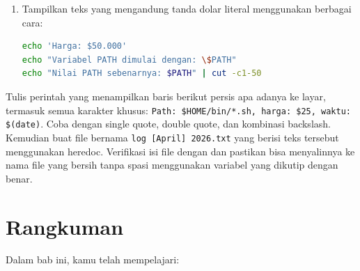 \begin{enumerate}
\begin{lstlisting}[language=bash, caption={Variabel untuk path dengan spasi}]
mkdir -p ~/lab-os/chapter06-bash/arsip
cp "$FILE_LAMA" "$FILE_BARU"
ls -lah ~/lab-os/chapter06-bash/arsip/
\end{lstlisting}
    \textit{Amati:} kutipan ganda pada \texttt{"\$FILE\_LAMA"} memastikan
    path yang mengandung spasi diperlakukan sebagai satu argumen, bukan
    dua argumen terpisah.

    \item Tampilkan teks yang mengandung tanda dolar literal menggunakan
          berbagai cara:
\begin{lstlisting}[language=bash, caption={Menampilkan karakter khusus secara literal}]
echo 'Harga: $50.000'
echo "Variabel PATH dimulai dengan: \$PATH"
echo "Nilai PATH sebenarnya: $PATH" | cut -c1-50
\end{lstlisting}
\end{enumerate}

\begin{challengebox}
Tulis perintah  yang menampilkan baris berikut persis apa
adanya ke layar, termasuk semua karakter khusus:
\texttt{Path: \$HOME/bin/*.sh, harga: \$25, waktu: \$(date)}.
Coba dengan single quote, double quote, dan kombinasi backslash. Kemudian
buat file bernama \texttt{log [April] 2026.txt} yang berisi teks tersebut
menggunakan heredoc. Verifikasi isi file dengan  dan pastikan
bisa menyalinnya ke nama file yang bersih tanpa spasi menggunakan
variabel yang dikutip dengan benar.
\end{challengebox}

\section{Rangkuman}
\label{sec:rangkuman-bash-shell}

Dalam bab ini, kamu telah mempelajari:

